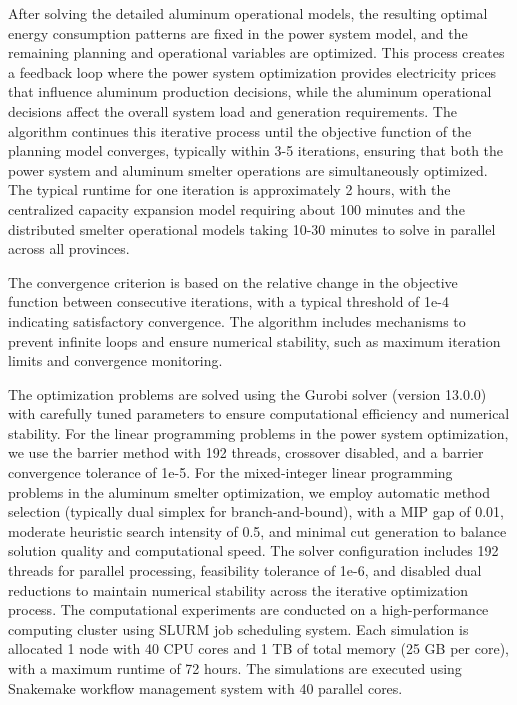 \documentclass[preprint,12pt]{elsarticle}
\begin{document}
After solving the detailed aluminum operational models, the resulting optimal energy consumption patterns are fixed in the power system model, and the remaining planning and operational variables are optimized. This process creates a feedback loop where the power system optimization provides electricity prices that influence aluminum production decisions, while the aluminum operational decisions affect the overall system load and generation requirements. The algorithm continues this iterative process until the objective function of the planning model converges, typically within 3-5 iterations, ensuring that both the power system and aluminum smelter operations are simultaneously optimized. The typical runtime for one iteration is approximately 2 hours, with the centralized capacity expansion model requiring about 100 minutes and the distributed smelter operational models taking 10-30 minutes to solve in parallel across all provinces. 

The convergence criterion is based on the relative change in the objective function between consecutive iterations, with a typical threshold of 1e-4 indicating satisfactory convergence. The algorithm includes mechanisms to prevent infinite loops and ensure numerical stability, such as maximum iteration limits and convergence monitoring.

The optimization problems are solved using the Gurobi solver (version 13.0.0) with carefully tuned parameters to ensure computational efficiency and numerical stability. For the linear programming problems in the power system optimization, we use the barrier method with 192 threads, crossover disabled, and a barrier convergence tolerance of 1e-5. For the mixed-integer linear programming problems in the aluminum smelter optimization, we employ automatic method selection (typically dual simplex for branch-and-bound), with a MIP gap of 0.01, moderate heuristic search intensity of 0.5, and minimal cut generation to balance solution quality and computational speed. The solver configuration includes 192 threads for parallel processing, feasibility tolerance of 1e-6, and disabled dual reductions to maintain numerical stability across the iterative optimization process.
The computational experiments are conducted on a high-performance computing cluster using SLURM job scheduling system. Each simulation is allocated 1 node with 40 CPU cores and 1 TB of total memory (25 GB per core), with a maximum runtime of 72 hours. The simulations are executed using Snakemake workflow management system with 40 parallel cores.
\end{document}

